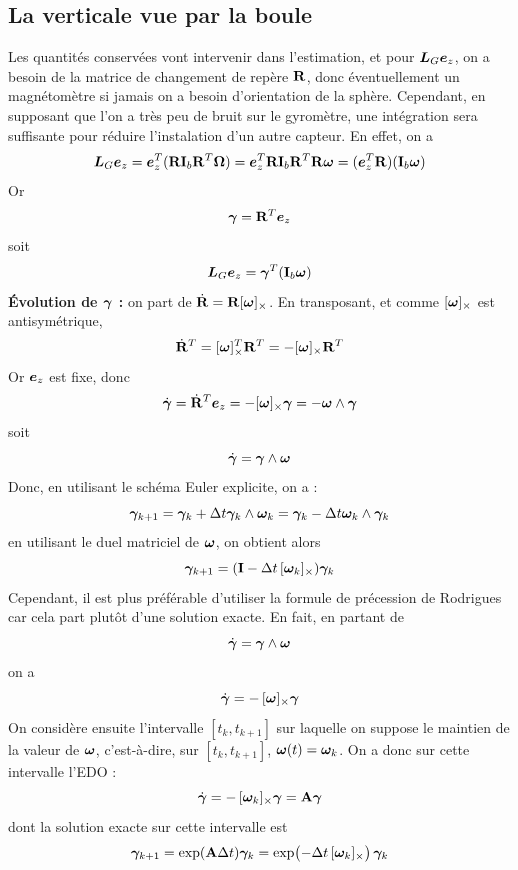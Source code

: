 \subsection{La verticale vue par la boule}
Les quantités conservées vont intervenir dans l'estimation, et pour $\bm{L} _G \bm{e}_z $, on a besoin de la matrice de changement de repère $\mathbf{R}$, donc éventuellement un magnétomètre si jamais on a besoin d'orientation de la sphère. Cependant, en supposant que l'on a très peu de bruit sur le gyromètre, une intégration sera suffisante pour réduire l'instalation d'un autre capteur. En effet, on a 
\[\bm{L}_G \bm{e}_z = \bm{e}_z ^T (\mathbf{R} \mathbf{I}_b \mathbf{R}^T \bm{\Omega}) = \bm{e}_z ^T \mathbf{R} \mathbf{I}_b \mathbf{R}^T \mathbf{R} \bm{\omega} = (\bm{e}_z ^T\mathbf{R})(\mathbf{I}_b \bm{\omega})
\]
Or
\[
    \bm{\gamma} = \mathbf{R}^T\bm{e}_z
\]
soit
\[
\bm{L}_G \bm{e}_z = \bm{\gamma} ^ T(\mathbf{I}_b \bm{\omega})
\]
\textbf{Évolution de $\bm{\gamma}$ : } on part de
$\dot{\mathbf{R}} = \mathbf{R}[\bm{\omega}]_{\times}$. En transposant, et
comme $[\bm{\omega}]_{\times}$ est antisymétrique,
\[
    \dot{\mathbf{R}}^T = [\bm{\omega}]_{\times}^T\mathbf{R}^T
    = -[\bm{\omega}]_{\times}\mathbf{R}^T
\]
Or $\bm{e}_z$ est fixe, donc
\[
    \dot{\bm{\gamma}} = \dot{\mathbf{R}}^T\bm{e}_z
    = -[\bm{\omega}]_{\times}\bm{\gamma}
    = -\bm{\omega}\wedge\bm{\gamma}
\]
soit
\[
    \dot{\bm{\gamma}} = \bm{\gamma}\wedge\bm{\omega}
\]
Donc, en utilisant le schéma Euler explicite, on a : 
\[
    \bm{\gamma}_{k+1} = \bm{\gamma}_k + \Delta t \bm{\gamma}_k \wedge \bm{\omega}_k = \bm{\gamma}_k - \Delta t  \bm{\omega}_k \wedge \bm{\gamma}_k 
\]
en utilisant le duel matriciel de $\bm{\omega}$, on obtient alors 
\[
    \bm{\gamma}_{k+1} = (\mathbf{\mathbf{I}} - \Delta t\,[\bm{\omega}_k]_{\times})\bm{\gamma}_k
\]
Cependant, il est plus préférable d'utiliser la formule de précession de Rodrigues car cela part plutôt d'une solution exacte. En fait, en partant de
\[
    \dot{\bm{\gamma}} = \bm{\gamma}\wedge\bm{\omega}
\]
on a
\[
\dot{\bm{\gamma}} = -\,[\bm{\omega}]_{\times}\bm{\gamma}
\]
On considère ensuite l'intervalle $[t_k, t_{k+1}]$ sur laquelle on suppose le maintien de la valeur de $\bm{\omega}$, c'est-à-dire, sur $[t_k, t_{k+1}]$, $\bm{\omega}(t) = \bm{\omega}_k$. On a donc sur cette intervalle l'EDO : 
\[
\dot{\bm{\gamma}} = -\,[\bm{\omega}_k ]_{\times} \bm{\gamma} = \mathbf{A} \bm{\gamma}
\]
dont la solution exacte sur cette intervalle est
\[
\bm{ \gamma}_{k+1} = \exp(\mathbf{A}\Delta t) \bm{\gamma}_k = \exp\bigl(-\Delta t\,[\bm{\omega}_k]_{\times}\bigr)\,\bm{\gamma}_k
\]
